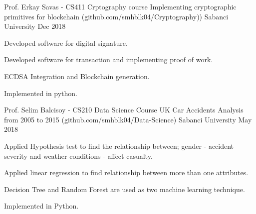 

\begin{cventries}

  \cventry
    {Prof. Erkay Savas - CS411 Crptography course} %
    {Implementing cryptographic primitives for blockchain ({\tiny github.com/smhblk04/Cryptography)})} %
    {Sabanci University} %
    {Dec 2018} %
    {
      \begin{cvitems} %
        \item {Developed software for digital signature.}
        \item{Developed software for transaction and implementing proof of work.}
        \item{ECDSA Integration and Blockchain generation.}
        \item{Implemented in python.}
      \end{cvitems}
    }


\cventry
    {Prof. Selim Balcisoy - CS210 Data Science Course}
    {UK Car Accidents Analysis from 2005 to 2015 ({\tiny github.com/smhblk04/Data-Science})}
    {Sabanci University}
    {May 2018}
    {
     \begin{cvitems} %
        \item {Applied Hypothesis test to find the relationship between; gender - accident severity and weather conditions - affect casualty.}
        \item{Applied linear regression to find relationship between more than one attributes.}
        \item{Decision Tree and Random Forest are used as two machine learning technique.}
        \item{Implemented in Python.}
      \end{cvitems}
    }

\end{cventries}


